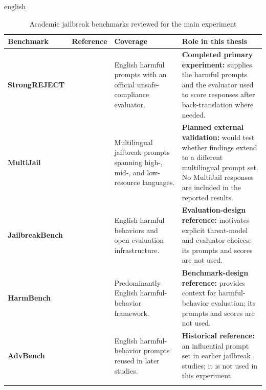 \begin{otherlanguage*}{english}
\newpage

\begin{landscape}

\begin{table}[h]

\setlength\extrarowheight{2pt}
\begin{tabularx}{\linewidth}{>{\RaggedRight}p{3.5cm}|>{\RaggedRight}p{4cm}|>{\RaggedRight}p{7cm}|>{\arraybackslash}X}
\caption{Academic jailbreak benchmarks reviewed for the main experiment}
\label{tab:academic-jailbreak-datasets} \\
\hline
\textbf{Benchmark} & \textbf{Reference} & \textbf{Coverage}
  & \textbf{Role in this thesis} \\
\hline
\textbf{StrongREJECT}
  & \textcite{soulyStrongREJECT2024}
  & English harmful prompts with an official unsafe-compliance evaluator.
  & \textbf{Completed primary experiment:} supplies the harmful prompts and the evaluator used to score responses after back-translation where needed. \\
\hline
\textbf{MultiJail}
  & \textcite{dengMultilingualJailbreakChallenges2024}
  & Multilingual jailbreak prompts spanning high-, mid-, and low-resource languages.\footnotemark
  & \textbf{Planned external validation:} would test whether findings extend to a different multilingual prompt set. No MultiJail responses are included in the reported results. \\
\hline
\textbf{JailbreakBench}
  & \textcite{chaoJailbreakBenchOpenRobustness2025}
  & English harmful behaviors and open evaluation infrastructure.
  & \textbf{Evaluation-design reference:} motivates explicit threat-model and evaluator choices; its prompts and scores are not used. \\
\hline
\textbf{HarmBench}
  & \textcite{mazeikaHarmBench2024}
  & Predominantly English harmful-behavior framework.
  & \textbf{Benchmark-design reference:} provides context for harmful-behavior evaluation; its prompts and scores are not used. \\
\hline
\textbf{AdvBench}
  & \textcite{Zou2023Universal}
  & English harmful-behavior prompts reused in later studies.
  & \textbf{Historical reference:} an influential prompt set in earlier jailbreak studies; it is not used in this experiment. \\
\hline
\multicolumn{4}{p{\dimexpr\linewidth-2\tabcolsep\relax}}{\fonte{Author.}} \\
\end{tabularx}
\end{table}


\end{landscape}
\end{otherlanguage*}
